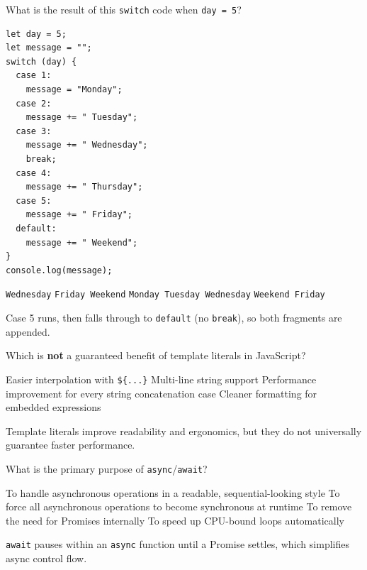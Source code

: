 \question[4]
What is the result of this \texttt{switch} code when \texttt{day = 5}?
\begin{lstlisting}[style=jsexam]
let day = 5;
let message = "";
switch (day) {
  case 1:
    message = "Monday";
  case 2:
    message += " Tuesday";
  case 3:
    message += " Wednesday";
    break;
  case 4:
    message += " Thursday";
  case 5:
    message += " Friday";
  default:
    message += " Weekend";
}
console.log(message);
\end{lstlisting}
\begin{choices}
  \choice \texttt{Wednesday}
  \CorrectChoice \texttt{Friday Weekend}
  \choice \texttt{Monday Tuesday Wednesday}
  \choice \texttt{Weekend Friday}
\end{choices}
\begin{solution}
  Case 5 runs, then falls through to \texttt{default} (no \texttt{break}), so both fragments are appended.
\end{solution}

\question[4]
Which is \textbf{not} a guaranteed benefit of template literals in JavaScript?
\begin{choices}
  \choice Easier interpolation with \texttt{\$\{...\}}
  \choice Multi-line string support
  \CorrectChoice Performance improvement for every string concatenation case
  \choice Cleaner formatting for embedded expressions
\end{choices}
\begin{solution}
  Template literals improve readability and ergonomics, but they do not universally guarantee faster performance.
\end{solution}

\question[4]
What is the primary purpose of \texttt{async}/\texttt{await}?
\begin{choices}
  \CorrectChoice To handle asynchronous operations in a readable, sequential-looking style
  \choice To force all asynchronous operations to become synchronous at runtime
  \choice To remove the need for Promises internally
  \choice To speed up CPU-bound loops automatically
\end{choices}
\begin{solution}
  \texttt{await} pauses within an \texttt{async} function until a Promise settles, which simplifies async control flow.
\end{solution}

